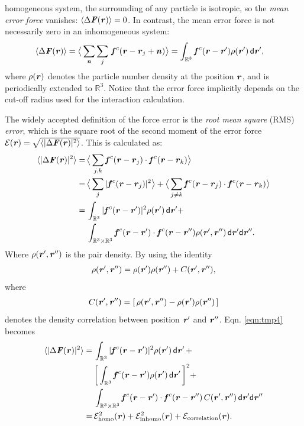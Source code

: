 \documentclass[preprint]{revtex4}
\renewcommand{\v}[1]{\textbf{\textit{#1}}}
\renewcommand{\d}[1]{\textsf{#1}}
\begin{document}
homogeneous system, the surrounding of any particle is isotropic, so
the \emph{mean error force} vanishes: $\langle\Delta\v F(\v r)\rangle
= 0$. In contrast, the mean error force is not necessarily zero in an
inhomogeneous system:
\begin{align} \label{eqn:tmp3} %
  \langle\Delta\v F(\v r)\rangle
  &=
  \big\langle
  \sum_{\v n}\sum_{j}\, \v f^c(\v r - \v r_j + \v n)
  \big\rangle 
  =
  \int_{\mathbb R^3}\v f^c(\v r - \v r')\rho(\v r')\,\d d\v r',
\end{align}
where $\rho(\v r)$ denotes the particle number density at the position
$\v r$, and is periodically extended to $\mathbb R^3$. Notice that the
error force implicitly depends on the cut-off radius used for the
interaction calculation.

The widely accepted definition of the force error is the \emph{root
  mean square} (RMS) \emph{error}, which is the square root of the second
moment of the error force $\mathcal E(\v r) =
\sqrt{\langle\vert\Delta\v F(\v r)\vert^2\rangle}$. This is 
calculated as:
\begin{align} \nonumber
  \langle\vert\Delta\v F(\v r)\vert^2\rangle
  =\,&
  \big\langle\sum_{j,k}\v f^c(\v r - \v r_j)\cdot\v f^c(\v r - \v r_k)\big\rangle \\ \nonumber
  =\,&
  \big\langle\sum_j\vert\v f^c(\v r - \v r_j)\vert^2\big\rangle +
  \big\langle\sum_{j\neq k}\v f^c(\v r - \v r_j)\cdot\v f^c(\v r - \v r_k)\big\rangle \\ \nonumber
  =\,&
  \int_{\mathbb R^3}\vert\v f^c(\v r - \v r')\vert^2\rho(\v r')\,\d d\v r'
  + \\\label{eqn:tmp4}
  \,&
  \int_{\mathbb R^3\times\mathbb R^3}\v f^c(\v r - \v r')\cdot\v f^c(\v r - \v r'')\rho(\v r', \v r'')\,\d d\v r'\d d\v r''.
\end{align}
Where  $\rho(\v r', \v r'')$ is the pair density. By using the identity
\begin{align}  \label{eqn:tmp7}
  \rho(\v r', \v r'')
  = \rho(\v r')\rho(\v r'') + C (\v r', \v r''),
\end{align}
where 
\begin{align}
C (\v r', \v r'') = [\,\rho(\v r', \v r'') -  \rho(\v r')\rho(\v r'')\,]
\end{align}
denotes the density correlation between position $\v r'$ and $\v
r''$. Eqn. \eqref{eqn:tmp4} becomes
\begin{align} \nonumber
  \langle\vert\Delta\v F(\v r)\vert^2\rangle
  = &\,
  \int_{\mathbb R^3}\vert\v f^c(\v r - \v r')\vert^2\rho(\v r')\,\d d\v r' \,+ \\\nonumber
  &\,
  \bigg[\int_{\mathbb R^3}\v f^c(\v r - \v r')\rho(\v r')\,\d d\v r'\,\bigg]^2 + \\\nonumber
  &\,
  \int_{\mathbb R^3\times\mathbb R^3}\v f^c(\v r - \v r')\cdot\v f^c(\v r - \v r'')\,C(\v r', \v r'')\,\d d\v r'\d d\v r'' \\\label{eqn:tmp5}
  = &\,
  \mathcal E^2_{\textrm{homo}}(\v r) +
  \mathcal E^2_{\textrm{inhomo}}(\v r) +
  \mathcal E_{\textrm{correlation}}(\v r).
\end{align}
\end{document}
